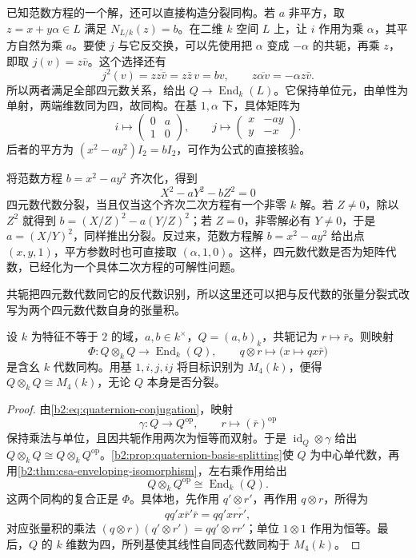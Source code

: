 已知范数方程的一个解，还可以直接构造分裂同构。若 \(a\) 非平方，取 \(z=x+y\alpha\in L\) 满足 \(N_{L/k}(z)=b\)。在二维 \(k\) 空间 \(L\) 上，让 \(i\) 作用为乘 \(\alpha\)，其平方自然为乘 \(a\)。要使 \(j\) 与它反交换，可以先使用把 \(\alpha\) 变成 \(-\alpha\) 的共轭，再乘 \(z\)，即取 \(j(v)=z\bar v\)。这个选择还有
\[
	j^2(v)=z\overline{z\bar v}=z\bar z\,v=bv, \qquad z\overline{\alpha v}=-\alpha z\bar v.
\]
所以两者满足全部四元数关系，给出 \(Q\to\operatorname{End}_k(L)\)。它保持单位元，由单性为单射，两端维数同为四，故同构。在基 \(1,\alpha\) 下，具体矩阵为
\[
	i\longmapsto\begin{pmatrix}0&a\\1&0\end{pmatrix},\qquad
	j\longmapsto\begin{pmatrix}x&-ay\\y&-x\end{pmatrix}.
\]
后者的平方为 \((x^2-a y^2)I_2=bI_2\)，可作为公式的直接核验。

\ProseParagraphBreak
将范数方程 \(b=x^2-ay^2\) 齐次化，得到
\[
	X^2-aY^2-bZ^2=0
\]
四元数代数分裂，当且仅当这个齐次二次方程有一个非零 \(k\) 解。若 \(Z\ne0\)，除以 \(Z^2\) 就得到 \(b=(X/Z)^2-a(Y/Z)^2\)；若 \(Z=0\)，非零解必有 \(Y\ne0\)，于是 \(a=(X/Y)^2\)，同样推出分裂。反过来，范数方程解 \(b=x^2-a y^2\) 给出点 \((x,y,1)\)，平方参数时也可直接取 \((\alpha,1,0)\)。这样，四元数代数是否为矩阵代数，已经化为一个具体二次方程的可解性问题。

\ProseParagraphBreak
共轭把四元数代数同它的反代数识别，所以这里还可以把与反代数的张量分裂式改写为两个四元数代数自身的张量积。

\begin{proposition}\label{b2:prop:quaternion-tensor-square}
	设 \(k\) 为特征不等于 \(2\) 的域，\(a,b\in k^\times\)，\(Q=(a,b)_k\)，共轭记为 \(r\mapsto\bar r\)。则映射
	\[
		\Phi:Q\otimes_kQ\longrightarrow\operatorname{End}_k(Q), \qquad q\otimes r\longmapsto\bigl(x\longmapsto qx\bar r\bigr)
	\]
	是含幺 \(k\) 代数同构。用基 \(1,i,j,ij\) 将目标识别为 \(M_4(k)\)，便得 \(Q\otimes_kQ\cong M_4(k)\)，无论 \(Q\) 本身是否分裂。
\end{proposition}
\begin{proof}
	由\eqref{b2:eq:quaternion-conjugation}，映射
	\[
		\gamma:Q\longrightarrow Q^{\mathrm{op}},\qquad r\longmapsto(\bar r)^{\mathrm{op}}
	\]
	保持乘法与单位，且因共轭作用两次为恒等而双射。于是 \(\operatorname{id}_Q\otimes\gamma\) 给出 \(Q\otimes_kQ\cong Q\otimes_kQ^{\mathrm{op}}\)。\cref{b2:prop:quaternion-basis-splitting}使 \(Q\) 为中心单代数，再用\cref{b2:thm:csa-enveloping-isomorphism}，左右乘作用给出
	\[
		Q\otimes_kQ^{\mathrm{op}}\cong\operatorname{End}_k(Q).
	\]
	这两个同构的复合正是 \(\Phi\)。具体地，先作用 \(q'\otimes r'\)，再作用 \(q\otimes r\)，所得为
	\[
		qq'x\bar r'\bar r=qq'x\overline{rr'},
	\]
	对应张量积的乘法 \((q\otimes r)(q'\otimes r')=qq'\otimes rr'\)；单位 \(1\otimes1\) 作用为恒等。最后，\(Q\) 的 \(k\) 维数为四，所列基使其线性自同态代数同构于 \(M_4(k)\)。
\end{proof}

